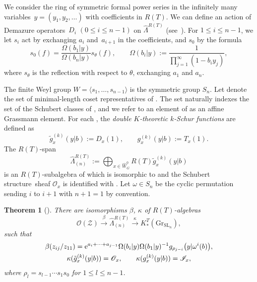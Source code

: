 \documentclass[10pt,a4paper]{amsart}
\numberwithin{equation}{section}
\newcommand{\Gr}{\mathrm{Gr}}
\newcommand{\Rep}{{R(T)}}
\newcommand{\SL}{\mathrm{SL}}
\newtheorem{Theorem}{Theorem}[section]
\theoremstyle{definition}
\begin{document}
We consider the
ring \smash{$\hat{\Lambda}^{\Rep}$} of symmetric
formal power series
in the infinitely many variables~${y=(y_1,y_2,\dots)}$ with coefficients in
$\Rep$.
We can define an action of Demazure operators~$D_i$ $(0\le i\le n-1)$
on $\hat{\Lambda}^{\Rep}$ (see~\cite{ISY}).
For $1\le i\le n-1$, we
let $s_i$ act by exchanging
$a_i$ and~$a_{i+1}$
in the coefficients,
and $s_0$ by
the formula
\begin{equation}
\label{eq:s0_Omega}
s_0(f)=\frac{\Omega(b_1|y)}{\Omega(b_n|y)}s_\theta(f),\qquad
\Omega(b_i|y):=\frac{1}{\prod_{j=1}^{\infty}(1-b_i y_j)},
\end{equation}
where $s_\theta $ is the reflection with respect to $\theta$,
exchanging $a_1$ and $a_n$.

The finite Weyl group $W=\langle s_1,\dots,s_{n-1}\rangle$ is the symmetric group $S_n$.
Let  denote the set of minimal-length coset representatives of . The set  naturally indexes the set of the Schubert classes of \smash{$K_*^T(\Gr_{G})$},
and we refer to an element of  as an affine Grassmann element.
For each
\cite{ISY},
the \emph{double $K$-theoretic $k$-Schur functions}
are defined
as
\begin{equation}
\label{eq:def:tg,g}
\tilde{g}_x^{(k)}(y|b):=D_x (1),\qquad
g_x^{(k)}(y|b):=T_x (1).
\end{equation}
The $\Rep$-span
\[
\hat{\Lambda}^{\Rep}_{(n)}:=\bigoplus_{x\in \hat{W}_G^0}
\Rep \tilde{g}_x^{(k)}(y|b)
\]
is an $\Rep$-subalgebra of
\smash{$\hat{\Lambda}
_\Rep$} which is
isomorphic to
\smash{$K_*^T(\Gr_{\SL_n})$} and the Schubert structure~sheaf $\mathscr{O}_x$
is identified with .
Let $\omega\in S_n$ be the cyclic permutation sending $i$ to $i+1$ with $n+1=1$ by convention.



\begin{Theorem}[\cite{ISY}]
\label{thm:ISY}
There are
isomorphisms $\beta$, $\kappa$ of $R(T)$-algebras
\[%
\mathscr{O}(\mathscr{Z})
\overset{\beta}{\longrightarrow }
 \hat{\Lambda}_{(n)}^\Rep
 \overset{\kappa}{\longrightarrow}
 K_*^T(\Gr_{\SL_n}),
\]
such that
\begin{gather}
\beta(z_{ij}/z_{11})= {\rm e}^{a_i+\cdots+a_{j-1}}\Omega(b_i|y)\Omega(b_1|y)^{-1}g_{\rho_{j-i}}\big(y|\omega^i(b)\big),\nonumber
\\
\kappa(\tilde{g}_{x}^{(k)}(y|b))
= \mathscr{O}_x,
\qquad
\kappa(g_{x}^{(k)}(y|b))=\mathscr{I}_{x},\label{eq:zij_in_KkSchur}
\end{gather}
where $\rho_l=s_{l-1}\cdots s_{1}s_{0}$ for $1\le l\le n-1 $.
\end{Theorem}
\end{document}
